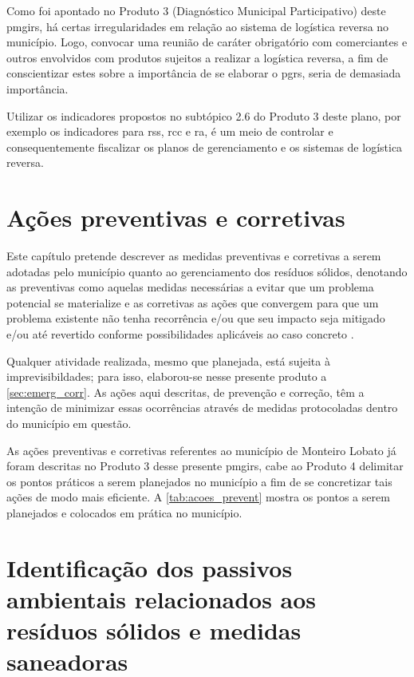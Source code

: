 Como foi apontado no Produto 3 (Diagnóstico Municipal Participativo) deste \gls{pmgirs}, há certas irregularidades em relação ao sistema de logística reversa no município. Logo, convocar uma reunião de caráter obrigatório com comerciantes e outros envolvidos com produtos sujeitos a realizar a logística reversa, a fim de conscientizar estes sobre a importância de se elaborar o \gls{pgrs}, seria de demasiada importância. 

Utilizar os indicadores propostos no subtópico 2.6 do Produto 3 deste plano, por exemplo os indicadores para \gls{rss}, \gls{rcc} e \gls{ra}, é um meio de controlar e consequentemente fiscalizar os planos de gerenciamento e os sistemas de logística reversa.



\FloatBarrier
\newpage
\section{Ações preventivas e corretivas}
\label{sec:acoes_prev_corr}

Este capítulo pretende descrever as medidas preventivas e corretivas a serem adotadas pelo município quanto ao gerenciamento dos resíduos sólidos, denotando as preventivas como aquelas medidas necessárias a evitar que um problema potencial se materialize e as corretivas as ações que convergem para que um problema existente não
tenha recorrência e/ou que seu impacto seja mitigado e/ou até revertido conforme possibilidades aplicáveis ao caso concreto \cite{pmgirs_aruja3_2018}.

Qualquer atividade realizada, mesmo que planejada, está sujeita à imprevisibildades; para isso, elaborou-se nesse presente produto a \autoref{sec:emerg_corr}. As ações aqui descritas, de prevenção e correção, têm a intenção de minimizar essas ocorrências através de medidas protocoladas dentro do município em questão.

As ações preventivas e corretivas referentes ao município de Monteiro Lobato já foram descritas no Produto 3 desse presente \gls{pmgirs}, cabe ao Produto 4 delimitar os pontos práticos a serem planejados no município a fim de se concretizar tais ações de modo mais eficiente. A \autoref{tab:acoes_prevent} mostra os pontos a serem planejados e colocados em prática no município.


\FloatBarrier

\newpage
\section{Identificação dos passivos ambientais relacionados aos resíduos sólidos e medidas saneadoras}
\label{sec:passivos_amb}

